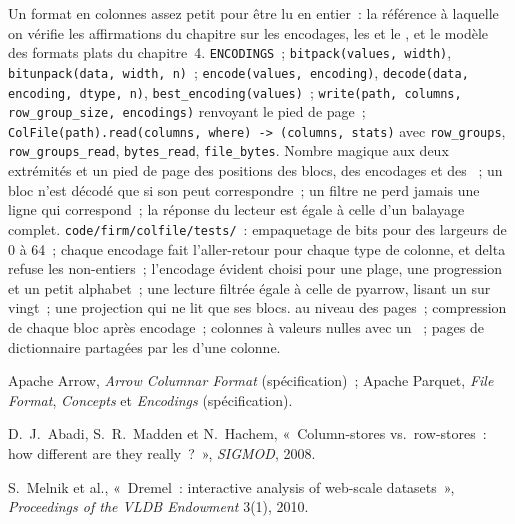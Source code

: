 \begin{build}
 Un format en colonnes assez petit pour être lu en entier~: la référence à laquelle on vérifie les affirmations du chapitre
sur les encodages, les  et le , et le modèle des formats plats du chapitre~4.
 \texttt{ENCODINGS}~; \texttt{bitpack(values, width)}, \texttt{bitunpack(data, width, n)}~;
\texttt{encode(values, encoding)}, \texttt{decode(data, encoding, dtype, n)}, \texttt{best\_encoding(values)}~;
\texttt{write(path, columns, row\_group\_size, encodings)} renvoyant le pied de page~;
\texttt{ColFile(path).read(columns, where) -> (columns, stats)} avec \texttt{row\_groups}, \texttt{row\_groups\_read}, \texttt{bytes\_read}, \texttt{file\_bytes}.
 Nombre magique aux deux extrémités et un pied de page des positions des blocs, des encodages et des ~; un bloc n'est décodé que si son
 peut correspondre~; un filtre ne perd jamais une ligne qui correspond~; la réponse du lecteur est égale à celle d'un balayage complet.
 \texttt{code/firm/colfile/tests/}~: empaquetage de bits pour des largeurs de 0 à 64~; chaque encodage fait l'aller-retour
pour chaque type de colonne, et delta refuse les non-entiers~; l'encodage évident choisi pour une plage, une progression et un petit alphabet~; une lecture filtrée
égale à celle de pyarrow, lisant un  sur vingt~; une projection qui ne lit que ses blocs.
  au niveau des pages~; compression de chaque bloc après encodage~; colonnes à valeurs nulles avec un ~;
pages de dictionnaire partagées par les  d'une colonne.
\end{build}

\begin{omsources}
\item Apache Arrow, \emph{Arrow Columnar Format} (spécification)~; Apache Parquet, \emph{File Format}, \emph{Concepts} et
\emph{Encodings} (spécification).
\item D.~J.~Abadi, S.~R.~Madden et N.~Hachem, «~Column-stores vs.\ row-stores~: how different are they really~?~», 
\emph{SIGMOD}, 2008.
\item S.~Melnik et al., «~Dremel~: interactive analysis of web-scale datasets~», \emph{Proceedings of the VLDB Endowment} 3(1),
2010.
\end{omsources}

